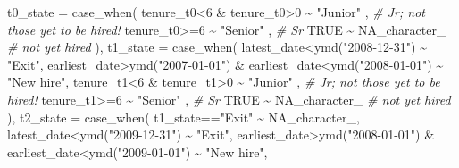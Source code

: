 \documentclass[
]{article}
\newenvironment{Shaded}{\begin{snugshade}}{\end{snugshade}}
\newcommand{\AttributeTok}[1]{\textcolor[rgb]{0.77,0.63,0.00}{#1}}
\newcommand{\CommentTok}[1]{\textcolor[rgb]{0.56,0.35,0.01}{\textit{#1}}}
\newcommand{\ConstantTok}[1]{\textcolor[rgb]{0.00,0.00,0.00}{#1}}
\newcommand{\DecValTok}[1]{\textcolor[rgb]{0.00,0.00,0.81}{#1}}
\newcommand{\FunctionTok}[1]{\textcolor[rgb]{0.00,0.00,0.00}{#1}}
\newcommand{\NormalTok}[1]{#1}
\newcommand{\SpecialCharTok}[1]{\textcolor[rgb]{0.00,0.00,0.00}{#1}}
\newcommand{\StringTok}[1]{\textcolor[rgb]{0.31,0.60,0.02}{#1}}
\begin{document}
\begin{Shaded}
\begin{Highlighting}[]
    \AttributeTok{t0\_state =} \FunctionTok{case\_when}\NormalTok{(}
\NormalTok{      tenure\_t0}\SpecialCharTok{\textless{}}\DecValTok{6} \SpecialCharTok{\&}\NormalTok{ tenure\_t0}\SpecialCharTok{\textgreater{}}\DecValTok{0} \SpecialCharTok{\textasciitilde{}} \StringTok{"Junior"}\NormalTok{  , }\CommentTok{\# Jr; not those yet to be hired!}
\NormalTok{      tenure\_t0}\SpecialCharTok{\textgreater{}=}\DecValTok{6}              \SpecialCharTok{\textasciitilde{}} \StringTok{"Senior"}\NormalTok{  , }\CommentTok{\# Sr}
      \ConstantTok{TRUE}                      \SpecialCharTok{\textasciitilde{}} \ConstantTok{NA\_character\_} \CommentTok{\# not yet hired}
\NormalTok{    ),}
    \AttributeTok{t1\_state =} \FunctionTok{case\_when}\NormalTok{(}
\NormalTok{      latest\_date}\SpecialCharTok{\textless{}}\FunctionTok{ymd}\NormalTok{(}\StringTok{"2008{-}12{-}31"}\NormalTok{)        }\SpecialCharTok{\textasciitilde{}} \StringTok{"Exit"}\NormalTok{,}
\NormalTok{      earliest\_date}\SpecialCharTok{\textgreater{}}\FunctionTok{ymd}\NormalTok{(}\StringTok{"2007{-}01{-}01"}\NormalTok{) }
        \SpecialCharTok{\&}\NormalTok{ earliest\_date}\SpecialCharTok{\textless{}}\FunctionTok{ymd}\NormalTok{(}\StringTok{"2008{-}01{-}01"}\NormalTok{) }\SpecialCharTok{\textasciitilde{}} \StringTok{"New hire"}\NormalTok{,}
\NormalTok{      tenure\_t1}\SpecialCharTok{\textless{}}\DecValTok{6} \SpecialCharTok{\&}\NormalTok{ tenure\_t1}\SpecialCharTok{\textgreater{}}\DecValTok{0}          \SpecialCharTok{\textasciitilde{}} \StringTok{"Junior"}\NormalTok{  , }\CommentTok{\# Jr; not those yet to be hired!}
\NormalTok{      tenure\_t1}\SpecialCharTok{\textgreater{}=}\DecValTok{6}                       \SpecialCharTok{\textasciitilde{}} \StringTok{"Senior"}\NormalTok{  , }\CommentTok{\# Sr}
      \ConstantTok{TRUE}                               \SpecialCharTok{\textasciitilde{}} \ConstantTok{NA\_character\_} \CommentTok{\# not yet hired}
\NormalTok{      ),}
    \AttributeTok{t2\_state =} \FunctionTok{case\_when}\NormalTok{(}
\NormalTok{      t1\_state}\SpecialCharTok{==}\StringTok{"Exit"}                   \SpecialCharTok{\textasciitilde{}} \ConstantTok{NA\_character\_}\NormalTok{,}
\NormalTok{      latest\_date}\SpecialCharTok{\textless{}}\FunctionTok{ymd}\NormalTok{(}\StringTok{"2009{-}12{-}31"}\NormalTok{)        }\SpecialCharTok{\textasciitilde{}} \StringTok{"Exit"}\NormalTok{,}
\NormalTok{      earliest\_date}\SpecialCharTok{\textgreater{}}\FunctionTok{ymd}\NormalTok{(}\StringTok{"2008{-}01{-}01"}\NormalTok{) }
        \SpecialCharTok{\&}\NormalTok{ earliest\_date}\SpecialCharTok{\textless{}}\FunctionTok{ymd}\NormalTok{(}\StringTok{"2009{-}01{-}01"}\NormalTok{) }\SpecialCharTok{\textasciitilde{}} \StringTok{"New hire"}\NormalTok{,}

\end{Highlighting}
\end{Shaded}
\end{document}
